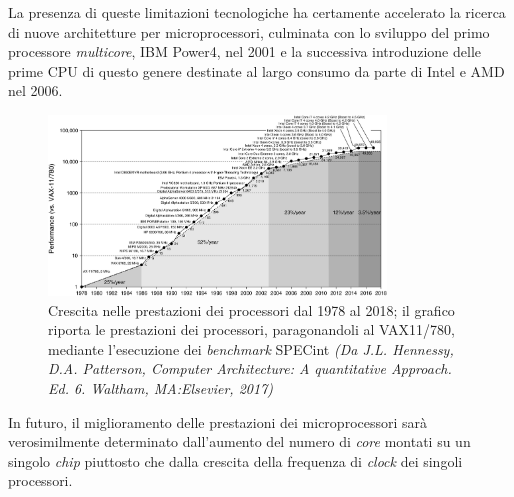 La presenza di queste limitazioni tecnologiche ha certamente accelerato la ricerca di nuove architetture per microprocessori, culminata con lo sviluppo del primo processore \textit{multicore}, IBM Power4, nel 2001 e la successiva introduzione delle prime CPU di questo genere destinate al largo consumo da parte di Intel e AMD nel 2006.
\begin{figure}[htbp]
    \centering
    \includegraphics[width=0.8\textwidth]{../Immagini/Capitolo 1/PrestazioniProcessori}
    \caption{Crescita nelle prestazioni dei processori dal 1978 al 2018; il grafico riporta le prestazioni dei processori, paragonandoli al VAX11/780, mediante l'esecuzione dei \textit{benchmark} SPECint \small{\textit{(Da J.L. Hennessy, D.A. Patterson, Computer Architecture: A quantitative Approach. Ed. 6. Waltham, MA:Elsevier, 2017)}}}
    \label{fig:PrestazioniProcessori}
\end{figure}\newline
In futuro, il miglioramento delle prestazioni dei microprocessori sar\`a verosimilmente determinato dall'aumento del numero di \textit{core} montati su un singolo \textit{chip} piuttosto che dalla crescita della frequenza di \textit{clock} dei singoli processori.